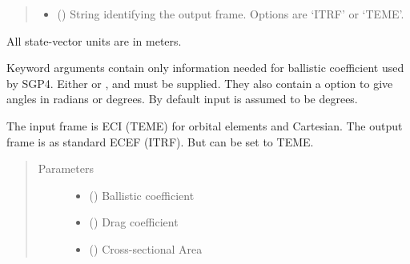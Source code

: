 \documentclass[letterpaper,10pt,english]{sphinxmanual}
\begin{document}
\begin{fulllineitems}
\begin{quote}
\begin{description}
\begin{itemize}
\item {} 
 () \textendash{} String identifying the output frame. Options are ‘ITRF’ or ‘TEME’.

\end{itemize}

\end{description}\end{quote}

\begin{fulllineitems}
\label{\detokenize{modules/propagator_sgp4:propagator_sgp4.PropagatorSGP4.get_orbit}}

All state-vector units are in meters.

Keyword arguments contain only information needed for ballistic coefficient  used by SGP4. Either  or ,  and  must be supplied.
They also contain a option to give angles in radians or degrees. By default input is assumed to be degrees.


The input frame is ECI (TEME) for orbital elements and Cartesian. The output frame is as standard ECEF (ITRF). But can be set to TEME.
\begin{quote}\begin{description}
\item[{Parameters}] \leavevmode\begin{itemize}
\item {} 
 () \textendash{} Ballistic coefficient

\item {} 
 () \textendash{} Drag coefficient

\item {} 
 () \textendash{} Cross-sectional Area


\end{itemize}
\end{description}
\end{quote}
\end{fulllineitems}
\end{fulllineitems}
\end{document}
